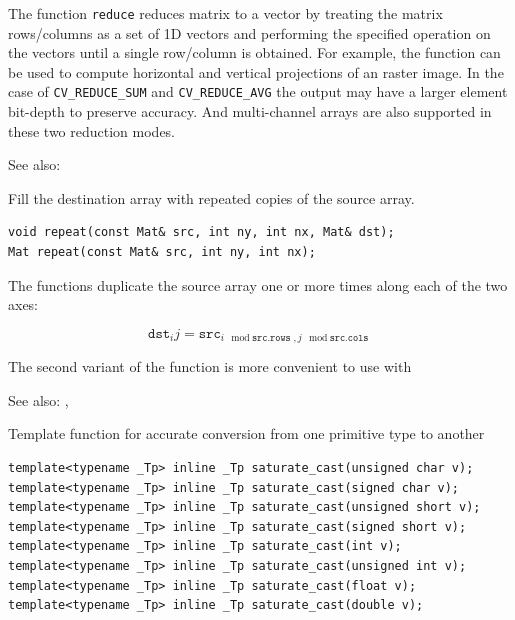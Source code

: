 The function \texttt{reduce} reduces matrix to a vector by treating the matrix rows/columns as a set of 1D vectors and performing the specified operation on the vectors until a single row/column is obtained. For example, the function can be used to compute horizontal and vertical projections of an raster image. In the case of \texttt{CV\_REDUCE\_SUM} and \texttt{CV\_REDUCE\_AVG} the output may have a larger element bit-depth to preserve accuracy. And multi-channel arrays are also supported in these two reduction modes. 

See also: 

\label{repeat}
Fill the destination array with repeated copies of the source array.

\begin{lstlisting}
void repeat(const Mat& src, int ny, int nx, Mat& dst);
Mat repeat(const Mat& src, int ny, int nx);
\end{lstlisting}
\begin{description}
\end{description}

The functions  duplicate the source array one or more times along each of the two axes:

\[\texttt{dst}_ij=\texttt{src}_{i \mod \texttt{src.rows}, j \mod \texttt{src.cols}}\]

The second variant of the function is more convenient to use with 

See also: , 

\label{saturate cast}
Template function for accurate conversion from one primitive type to another

\begin{lstlisting}
template<typename _Tp> inline _Tp saturate_cast(unsigned char v);
template<typename _Tp> inline _Tp saturate_cast(signed char v);
template<typename _Tp> inline _Tp saturate_cast(unsigned short v);
template<typename _Tp> inline _Tp saturate_cast(signed short v);
template<typename _Tp> inline _Tp saturate_cast(int v);
template<typename _Tp> inline _Tp saturate_cast(unsigned int v);
template<typename _Tp> inline _Tp saturate_cast(float v);
template<typename _Tp> inline _Tp saturate_cast(double v);
\end{lstlisting}
\begin{description}
\end{description}

